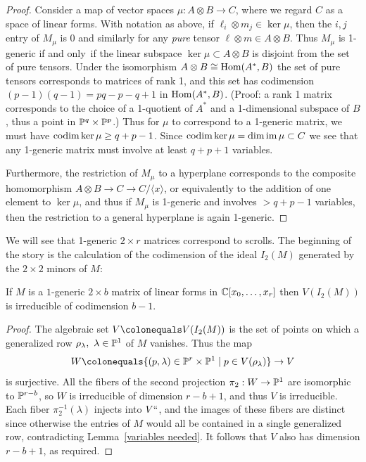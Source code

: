 \begin{proof} Consider a map of vector spaces $\mu : A\otimes B \to C$,
where we regard $C$ as a
space of linear forms.
With notation as above, if $\ell_i\otimes m_j\in \ker \mu$, then the $i,j$
entry of $M_\mu$ is 0 and similarly for
any \emph{pure} tensor $\ell\otimes m\in A\otimes B$. Thus $M_\mu$
is 1-generic if and only~if the linear subspace
$\ker \mu \subset  A\otimes B$
is disjoint from the set of pure tensors. Under the isomorphism $A\otimes
B \cong \operatorname{Hom} (A^*, B)$
the set of pure tensors corresponds to matrices of rank 1, and this set
has codimension $(p-1)(q-1) = pq-p-q+1$
in $\operatorname{Hom}(A^*, B)$. 
(Proof:
a rank 1 matrix corresponds to the choice of
a 1-quotient of $A^*$ and a 1-dimensional subspace
of $B$, thus a point in ${\mathbb P}^q \times {\mathbb P}^p$.)
Thus
for $\mu$ to correspond to a  1-generic matrix,  we must have $\operatorname{codim}
\ker \mu \geq q+p-1$. Since $\operatorname{codim} \ker \mu = \dim \operatorname{im} \mu\subset C$
we see that any 1-generic matrix must involve at least $q+p+1$ variables.

Furthermore, the restriction of $M_\mu$ to a hyperplane corresponds to
the composite homomorphism
$A\otimes B \to C \to C/\langle x \rangle$, or equivalently to the
addition of one element to $\ker \mu$, and thus
if $M_\mu$ is 1-generic and involves $>q+p-1$ variables, then the
restriction to a general hyperplane
is again 1-generic.
\end{proof}

We will see that 1-generic $2\times r$ matrices correspond to scrolls. The
beginning of the story is the
calculation of the codimension of the ideal $I_2(M)$ generated by the
$2\times 2$ minors of $M$:

\begin{lemma}\label{codim of 2,n 1-generic}
If $M$ is a $1$-generic $2\times b$ matrix of linear forms in
${\mathbb C}[x_0,\dots, x_r]$ then
$V(I_2(M))$ is irreducible of codimension $b-1$.
\unif
\end{lemma}

\begin{proof}
The algebraic set $V \colonequals   V(I_2(M))$ is the set of points
on which a generalized row $\rho_\lambda, \ \lambda\in {\mathbb P}^1$ of $M$
vanishes. Thus the map
$$
W \colonequals  \{(p, \lambda) \in \PP^{r}\times \PP^{1}\mid p\in
V(\rho_{\lambda})\} \to V
$$
is surjective. All the fibers of the second projection $\pi_{2}: W\to
{\mathbb P}^{1}$ are isomorphic to ${\mathbb P}^{r-b}$, so $W$ is
irreducible of dimension $r-b+1$, and thus $V$ is irreducible. Each
fiber $\pi_{2}^{-1}(\lambda)$
injects into $V` `$, and the images of these fibers are distinct since
otherwise the entries of $M$ would all
be contained in a single generalized row, contradicting
Lemma~\ref{variables needed}. It follows
that $V$ also has dimension $r-b+1$, as required.
\end{proof}

